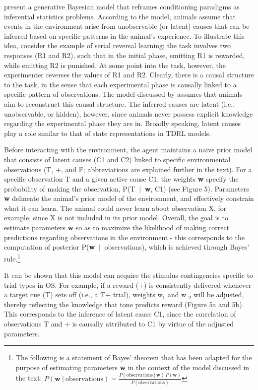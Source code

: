 \documentclass[11pt]{article}
\newcommand\given[1][]{\:#1\vert\:} %
\let\citeN=\citet
\begin{document}
\citeN{Courville2006} present a generative Bayesian model that reframes 
conditioning paradigms as inferential statistics problems. According to the 
model, animals assume that events in the environment arise from unobservable 
(or latent) causes that can be inferred based on specific patterns in the 
animal's experience. To illustrate this idea, consider the example of serial 
reversal learning; the task involves two responses (R1 and R2), such that in 
the initial phase, emitting R1 is rewarded, while emitting R2 is punished. At 
some point into the task, however, the experimenter reverses the values of R1 
and R2. Clearly, there is a causal structure to the task, in the sense that 
each experimental phase is causally linked to a specific pattern of 
observations. The model discussed by \citeN{Courville2006} assumes that animals 
aim to reconstruct this causal structure. The inferred causes are latent (i.e., 
unobservable, or hidden), however, since animals never possess explicit 
knowledge regarding the experimental phase they are in. Broadly speaking, 
latent causes play a role similar to that of state representations in TDRL 
models.

Before interacting with the environment, the agent maintains a naive prior 
model that consists of latent causes (C1 and C2) linked to specific 
environmental observations (T, $+$, and F; abbreviations are explained further 
in the text). For a specific observation T and a given active cause C1, the 
weights \textbf{w} specify the probability of making the observation, P(T $
\given$ \textbf{w}, C1) (see Figure 5). Parameters \textbf{w} delineate the 
animal's prior model of the environment, and effectively constrain what it can 
learn. The animal could never learn about observation X, for example, since X 
is not included in its prior model. Overall, the goal is to estimate parameters 
\textbf{w} so as to maximize the likelihood of making correct predictions 
regarding observations in the environment - this corresponds to the computation 
of posterior P(\textbf{w} $\given$ observations), which is achieved through 
Bayes' rule.\footnote{The following is a statement of Bayes' theorem that has 
been adapted for the purpose of estimating parameters \textbf{w} in the context 
of the model discussed in the text: $P(\textbf{w} \given \text{observations}) = 
\frac{P(\text{observations} \given \textbf{w}) \, P(\textbf{w})}
{P(\text{observations})}$}

It can be shown that this model can acquire the stimulus contingencies specific 
to trial types in OS. For example, if a reward ($+$) is consistently delivered 
whenever a target cue (T) sets off (i.e., a T$+$ trial), weights w$_{1}$ and w
$_{2}$ will be adjusted, thereby reflecting the knowledge that tone predicts 
reward (Figure 5a and 5b). This corresponds to the inference of latent cause 
C1, since the correlation of observations T and $+$ is causally attributed to 
C1 by virtue of the adjusted parameters.
\end{document}
